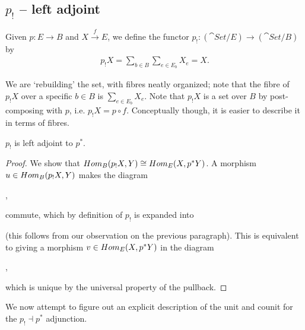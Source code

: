 \subsection{$p_!$ -- left adjoint}
Given $p: E\to B$ and $X\overset{f}{\to} E$, we define the functor $p_! : (\cat{Set}/ E)\to(\cat{Set}/ B)$ by
\begin{align*}
	p_!X = \sum_{b\in B} \sum_{e\in E_b} X_{e} = X.
\end{align*}

We are `rebuilding' the set, with fibres neatly organized; note that the fibre of $p_!X$ over a specific $b\in B$ is $\sum_{e\in E_b} X_e$. Note that $p_!X$ is a set over $B$ by post-composing with $p$, i.e. $p_!X = p \circ f$. Conceptually though, it is easier to describe it in terms of fibres.

\begin{proposition}
	$p_!$ is left adjoint to $p^*$.
\end{proposition}
\begin{proof}
	We show that $Hom_B(p_!X,Y) \cong Hom_E(X, p^*Y)$. A morphism $u\in Hom_B(p_!X,Y)$ makes the diagram
	\begin{center}
	,
	\end{center}
	commute, which by definition of $p_!$ is expanded into
	\begin{center}
	\end{center}
	(this follows from our observation on the previous paragraph). This is equivalent to giving a morphism $v\in Hom_E(X,p^*Y)$ in the diagram
	\begin{center}
	,
	\end{center}
	which is unique by the universal property of the pullback.
\end{proof}

We now attempt to figure out an explicit description of the unit and counit for the $p_! \dashv p^*$ adjunction.

\pagebreak
